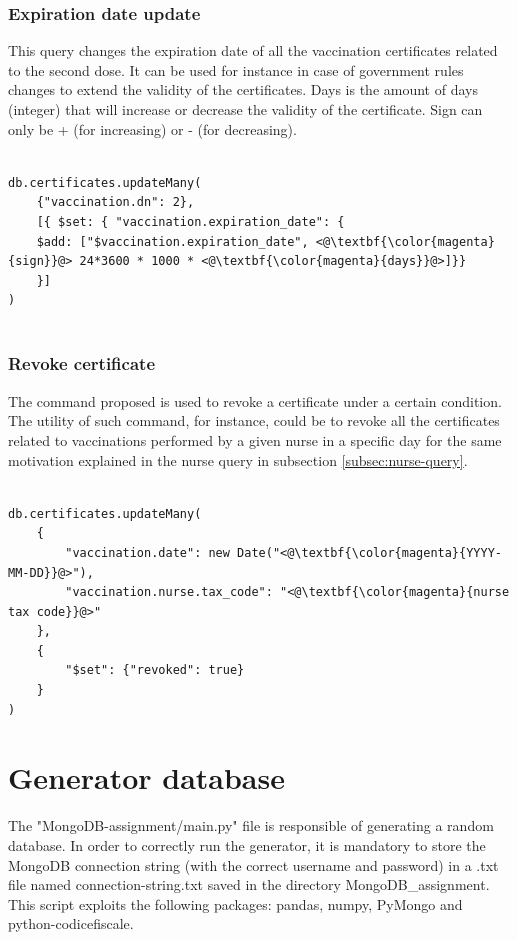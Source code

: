 \documentclass{article}
\begin{document}
\subsubsection{Expiration date update}
This query changes the expiration date of all the vaccination certificates related to the second dose. It can be used for instance in case of government rules changes to extend the validity of the certificates.
Days is the amount of days (integer) that will increase or decrease the validity of the certificate. Sign can only be + (for increasing) or - (for decreasing).

\begin{lstlisting}[language=cypher, label=lst:cypher-example]

db.certificates.updateMany(
    {"vaccination.dn": 2},
    [{ $set: { "vaccination.expiration_date": {
    $add: ["$vaccination.expiration_date", <@\textbf{\color{magenta}{sign}}@> 24*3600 * 1000 * <@\textbf{\color{magenta}{days}}@>]}}
    }]
)


\end{lstlisting}
\subsubsection{Revoke certificate}
The command proposed is used to revoke a certificate under a certain condition.
The utility of such command, for instance, could be to revoke all the certificates related to vaccinations performed by a given nurse in a specific day for the same motivation
explained in the nurse query in subsection \ref{subsec:nurse-query}.

\begin{lstlisting}[language=cypher, label=lst:cypher-example]

db.certificates.updateMany(
    {
        "vaccination.date": new Date("<@\textbf{\color{magenta}{YYYY-MM-DD}}@>"),
        "vaccination.nurse.tax_code": "<@\textbf{\color{magenta}{nurse tax code}}@>"
    },
    {
        "$set": {"revoked": true}
    }
)

\end{lstlisting}
\newpage
\section{Generator database}
The {\selectfont"MongoDB-assignment/main.py"} file is responsible of generating a random database.
In order to correctly run the generator, it is mandatory to store the MongoDB connection string (with the correct username and password) in a .txt file named {\selectfont connection-string.txt} saved in the directory {\selectfont MongoDB\_assignment}.
\\This script exploits the following packages: {\selectfont pandas, numpy, PyMongo and python-codicefiscale}.
\end{document}
